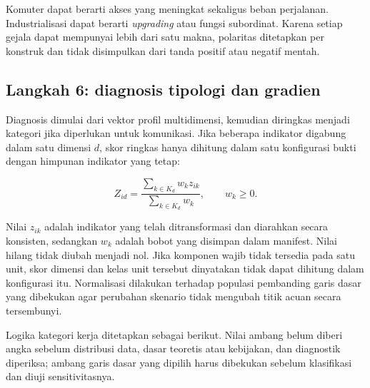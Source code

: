 \documentclass[11pt,a4paper,oneside,openany,indonesian]{report}
\begin{document}
Komuter dapat berarti akses yang meningkat sekaligus beban perjalanan.
Industrialisasi dapat berarti \emph{upgrading} atau fungsi subordinat.
Karena setiap gejala dapat mempunyai lebih dari satu makna, polaritas
ditetapkan per konstruk dan tidak disimpulkan
dari tanda positif atau negatif mentah.

\subsection{Langkah 6: diagnosis tipologi dan
gradien}\label{langkah-6-diagnosis-tipologi-dan-gradien}

Diagnosis dimulai dari vektor profil multidimensi, kemudian diringkas
menjadi kategori jika diperlukan untuk komunikasi. Jika beberapa
indikator digabung dalam satu dimensi \(d\), skor ringkas hanya dihitung
dalam satu konfigurasi bukti dengan himpunan indikator yang tetap:

\[
Z_{id}=\frac{\sum_{k \in K_d} w_k z_{ik}}{\sum_{k \in K_d} w_k}, \qquad w_k \geq 0.
\]

Nilai \(z_{ik}\) adalah indikator yang telah ditransformasi dan
diarahkan secara konsisten, sedangkan \(w_k\) adalah bobot yang disimpan
dalam manifest. Nilai hilang tidak diubah menjadi nol. Jika komponen
wajib tidak tersedia pada satu unit, skor dimensi dan kelas unit
tersebut dinyatakan tidak dapat dihitung dalam konfigurasi itu.
Normalisasi dilakukan terhadap populasi pembanding garis dasar yang
dibekukan agar perubahan skenario tidak mengubah titik acuan secara
tersembunyi.

Logika kategori kerja ditetapkan sebagai berikut. Nilai ambang belum
diberi angka sebelum distribusi data, dasar teoretis atau kebijakan, dan
diagnostik diperiksa; ambang garis dasar yang dipilih harus dibekukan
sebelum klasifikasi dan diuji sensitivitasnya.
\end{document}
